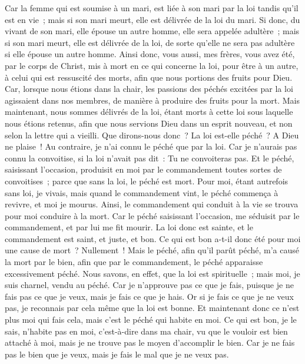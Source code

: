 \begin{multicols}{2}
Car la femme qui est soumise à un mari, est liée à son mari par la loi tandis qu'il est en vie~; mais si son mari meurt, elle est délivrée de la loi du mari.
Si donc, du vivant de son mari, elle épouse un autre homme, elle sera appelée adultère~; mais si son mari meurt, elle est délivrée de la loi, de sorte qu'elle ne sera pas adultère si elle épouse un autre homme.
Ainsi donc, vous aussi, mes frères, vous avez été, par le corps de Christ, mis à mort en ce qui concerne la loi, pour être à un autre, à celui qui est ressuscité des morts, afin que nous portions des fruits pour Dieu.
Car, lorsque nous étions dans la chair, les passions des péchés excitées par la loi agissaient dans nos membres, de manière à produire des fruits pour la mort.
Mais maintenant, nous sommes délivrés de la loi, étant morts à cette loi sous laquelle nous étions retenus, afin que nous servions Dieu dans un esprit nouveau, et non selon la lettre qui a vieilli.
Que dirons-nous donc~? La loi est-elle péché~? A Dieu ne plaise~! Au contraire, je n'ai connu le péché que par la loi. Car je n'aurais pas connu la convoitise, si la loi n'avait pas dit~: Tu ne convoiteras pas.
Et le péché, saisissant l'occasion, produisit en moi par le commandement toutes sortes de convoitises~; parce que sans la loi, le péché est mort.
Pour moi, étant autrefois sans loi, je vivais, mais quand le commandement vint, le péché commença à revivre, et moi je mourus.
Ainsi, le commandement qui conduit à la vie se trouva pour moi conduire à la mort.
Car le péché saisissant l'occasion, me séduisit par le commandement, et par lui me fit mourir.
La loi donc est sainte, et le commandement est saint, et juste, et bon.
Ce qui est bon a-t-il donc été pour moi une cause de mort~? Nullement~! Mais le péché, afin qu'il parût péché, m'a causé la mort par le bien, afin que par le commandement, le péché apparaisse excessivement péché.
Nous savons, en effet, que la loi est spirituelle~; mais moi, je suis charnel, vendu au péché.
Car je n'approuve pas ce que je fais, puisque je ne fais pas ce que je veux, mais je fais ce que je hais.
Or si je fais ce que je ne veux pas, je reconnais par cela même que la loi est bonne.
Et maintenant donc ce n'est plus moi qui fais cela, mais c'est le péché qui habite en moi.
Ce qui est bon, je le sais, n'habite pas en moi, c'est-à-dire dans ma chair, vu que le vouloir est bien attaché à moi, mais je ne trouve pas le moyen d'accomplir le bien.
Car je ne fais pas le bien que je veux, mais je fais le mal que je ne veux pas.

\end{multicols}
